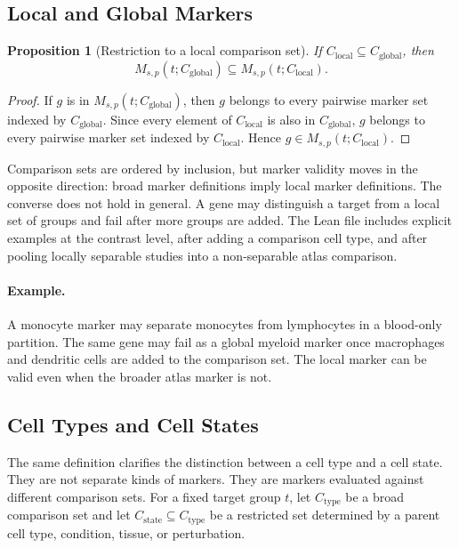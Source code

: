 \documentclass{article}
\newtheorem{proposition}{Proposition}
\begin{document}
\subsection{Local and Global Markers}

\begin{proposition}[Restriction to a local comparison set]\label{prop:comparison-family-monotonicity}
If $C_{\mathrm{local}}\subseteq C_{\mathrm{global}}$, then
\[
  M_{s,p}(t;C_{\mathrm{global}})
  \subseteq
  M_{s,p}(t;C_{\mathrm{local}}).
\]
\end{proposition}

\begin{proof}
If $g$ is in $M_{s,p}(t;C_{\mathrm{global}})$, then $g$ belongs to every pairwise marker set indexed by $C_{\mathrm{global}}$. Since every element of $C_{\mathrm{local}}$ is also in $C_{\mathrm{global}}$, $g$ belongs to every pairwise marker set indexed by $C_{\mathrm{local}}$. Hence $g\in M_{s,p}(t;C_{\mathrm{local}})$.
\end{proof}

Comparison sets are ordered by inclusion, but marker validity moves in the opposite direction: broad marker definitions imply local marker definitions. The converse does not hold in general. A gene may distinguish a target from a local set of groups and fail after more groups are added. The Lean file includes explicit examples at the contrast level, after adding a comparison cell type, and after pooling locally separable studies into a non-separable atlas comparison.

\paragraph{Example.}
A monocyte marker may separate monocytes from lymphocytes in a blood-only partition. The same gene may fail as a global myeloid marker once macrophages and dendritic cells are added to the comparison set. The local marker can be valid even when the broader atlas marker is not.

\subsection{Cell Types and Cell States}

The same definition clarifies the distinction between a cell type and a cell state. They are not separate kinds of markers. They are markers evaluated against different comparison sets. For a fixed target group $t$, let $C_{\mathrm{type}}$ be a broad comparison set and let $C_{\mathrm{state}}\subseteq C_{\mathrm{type}}$ be a restricted set determined by a parent cell type, condition, tissue, or perturbation.
\end{document}
